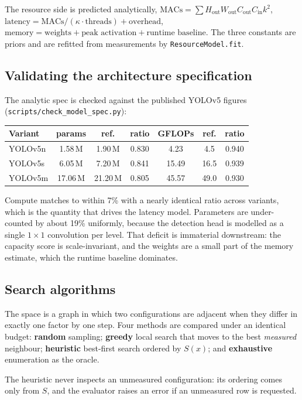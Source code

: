 \documentclass[11pt,a4paper]{article}
\begin{document}
The resource side is predicted analytically,
$\text{MACs}=\sum H_{\text{out}}W_{\text{out}}C_{\text{out}}C_{\text{in}}k^2$,
$\text{latency}=\text{MACs}/(\kappa\cdot\text{threads})+\text{overhead}$,
$\text{memory}=\text{weights}+\text{peak activation}+\text{runtime baseline}$.
The three constants are priors and are refitted from measurements by
\texttt{ResourceModel.fit}.

\subsection{Validating the architecture specification}

The analytic spec is checked against the published YOLOv5 figures
(\texttt{scripts/check\_model\_spec.py}):
\begin{center}
\begin{tabular}{@{}lcccccc@{}}
\toprule
Variant & params & ref. & ratio & GFLOPs & ref. & ratio \\
\midrule
YOLOv5n & 1.58\,M & 1.90\,M & 0.830 & 4.23 & 4.5  & 0.940 \\
YOLOv5s & 6.05\,M & 7.20\,M & 0.841 & 15.49 & 16.5 & 0.939 \\
YOLOv5m & 17.06\,M & 21.20\,M & 0.805 & 45.57 & 49.0 & 0.930 \\
\bottomrule
\end{tabular}
\end{center}
Compute matches to within 7\% with a nearly identical ratio across variants,
which is the quantity that drives the latency model. Parameters are under-counted
by about 19\% uniformly, because the detection head is modelled as a single
$1\times1$ convolution per level. That deficit is immaterial downstream: the
capacity score is scale-invariant, and the weights are a small part of the memory
estimate, which the runtime baseline dominates.

\subsection{Search algorithms}

The space is a graph in which two configurations are adjacent when they differ
in exactly one factor by one step. Four methods are compared under an identical
budget: \textbf{random} sampling; \textbf{greedy} local search that moves to the
best \emph{measured} neighbour; \textbf{heuristic} best-first search ordered by
$S(x)$; and \textbf{exhaustive} enumeration as the oracle.

The heuristic never inspects an unmeasured configuration: its ordering comes
only from $S$, and the evaluator raises an error if an unmeasured row is
requested.
\end{document}
